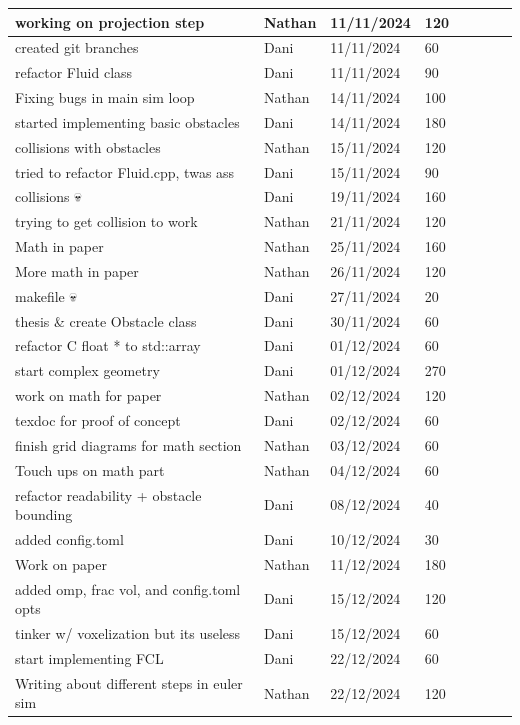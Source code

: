 \documentclass[a4paper,12pt,titlepage]{article}
\begin{document}
\begin{longtable}{|p{200pt}|l|l|l|l|l|l|l|}
	working on projection step & Nathan & 11/11/2024 & 120 \\ \hline
	created git branches & Dani & 11/11/2024 & 60 \\ \hline
	refactor Fluid class & Dani & 11/11/2024 & 90 \\ \hline
	Fixing bugs in main sim loop & Nathan & 14/11/2024 & 100 \\ \hline
	started implementing basic obstacles & Dani & 14/11/2024 & 180 \\ \hline
	collisions with obstacles & Nathan & 15/11/2024 & 120 \\ \hline
	tried to refactor Fluid.cpp, twas ass & Dani & 15/11/2024 & 90 \\ \hline
	collisions 💀 & Dani & 19/11/2024 & 160 \\ \hline
	trying to get collision to work & Nathan & 21/11/2024 & 120 \\ \hline
	Math in paper & Nathan & 25/11/2024 & 160 \\ \hline
	More math in paper & Nathan & 26/11/2024 & 120 \\ \hline
	makefile 💀 & Dani & 27/11/2024 & 20 \\ \hline
	thesis \& create Obstacle class & Dani & 30/11/2024 & 60 \\ \hline
	refactor C float *  to std::array & Dani & 01/12/2024 & 60 \\ \hline
	start complex geometry & Dani & 01/12/2024 & 270 \\ \hline
	work on math for paper & Nathan & 02/12/2024 & 120 \\ \hline
	texdoc for proof of concept & Dani & 02/12/2024 & 60 \\ \hline
	finish grid diagrams for math section & Nathan & 03/12/2024 & 60 \\ \hline
	Touch ups on math part & Nathan & 04/12/2024 & 60 \\ \hline
	refactor readability + obstacle bounding & Dani & 08/12/2024 & 40 \\ \hline
	added config.toml & Dani & 10/12/2024 & 30 \\ \hline
	Work on paper & Nathan  & 11/12/2024 & 180 \\ \hline
	added omp, frac vol, and config.toml opts & Dani & 15/12/2024 & 120 \\ \hline
	tinker w/ voxelization but its useless & Dani & 15/12/2024 & 60 \\ \hline
	start implementing FCL & Dani & 22/12/2024 & 60 \\ \hline
	Writing about different steps in euler sim  & Nathan & 22/12/2024 & 120 \\ \hline

\end{longtable}
\end{document}
